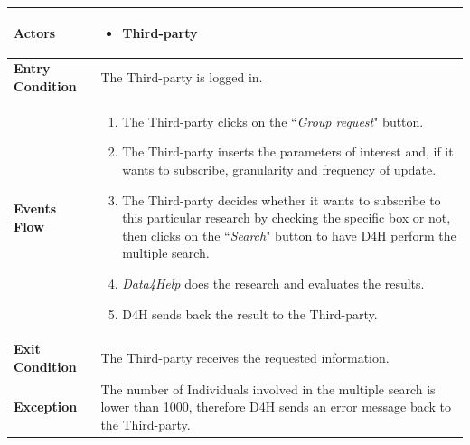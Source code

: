             \begin{table}[H]
            	\centering
                \begin{tabular}{|p{3cm}|p{8.2cm}|}
                    \hline
                    \textbf{Actors} &  \begin{itemize}
                        \item Third-party
                    \end{itemize} \\
                     \hline
                    \textbf{Entry Condition} & The Third-party is logged in. \\
                     \hline
                    \textbf{Events Flow} & \begin{enumerate}
                        \item The Third-party clicks on the ``\emph{Group request}" button.
                        \item The Third-party inserts the parameters of interest  and, if it wants to subscribe, granularity and frequency of update.
                        \item The Third-party decides whether it wants to subscribe to this particular research by checking the specific box or not, then clicks on the ``\emph{Search}" button to have D4H perform the multiple search.
                        \item \emph{Data4Help} does the research and evaluates the results.
                        \item D4H sends back the result to the Third-party.
                    \end{enumerate} \\
                     \hline
                    \textbf{Exit Condition} & The Third-party receives the requested information. \\
                     \hline
                    \textbf{Exception} & The number of Individuals involved in the multiple search is lower than 1000, therefore D4H sends an error message back to the Third-party. \\
                     \hline
                \end{tabular}  
            \end{table}
            
